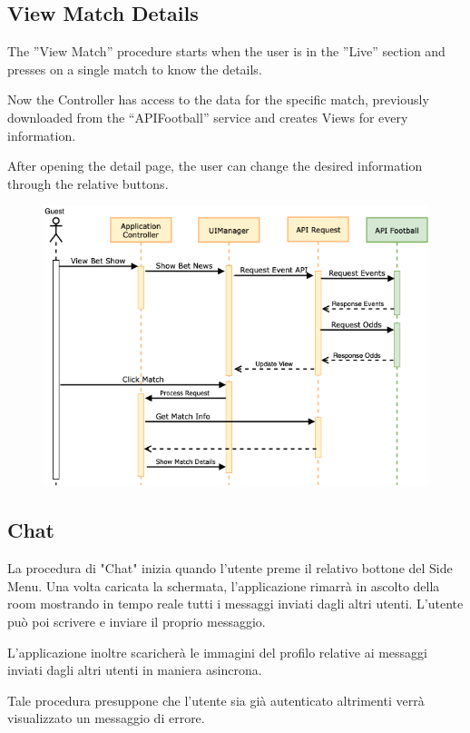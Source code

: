 \documentclass[numbers=noenddot, 12pt, a4paper, oneside]{scrbook}
\begin{document}
\newpage
\subsection*{View Match Details}
The ”View Match” procedure starts when the user is in the ”Live” section and presses on a single match to know the details.

Now the Controller has access to the data for the specific match, previously downloaded from the “APIFootball” service and creates Views for every information. 

After opening the detail page, the user can change the desired information through the relative buttons.

\begin{figure}[H]
	\centering
	\includegraphics[width=1\textwidth]{images/Sequence/SequenceMatchDetails}
\end{figure}

\newpage

\subsection*{Chat}
La procedura di "Chat" inizia quando l'utente preme il relativo bottone del Side Menu. Una volta caricata la schermata, l'applicazione rimarrà in ascolto della room mostrando in tempo reale tutti i messaggi inviati dagli altri utenti. L'utente può poi scrivere e inviare il proprio messaggio.

L'applicazione inoltre scaricherà le immagini del profilo relative ai messaggi inviati dagli altri utenti in maniera asincrona.

Tale procedura presuppone che l'utente sia già autenticato altrimenti verrà visualizzato un messaggio di errore.
\end{document}

